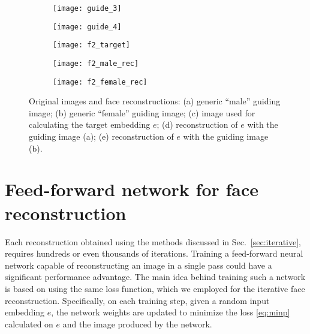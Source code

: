 \documentclass{article}
\def\Emb{e}
\newcommand{\Sec}[1]{Sec.~\ref{#1}}
\begin{document}
  \begin{figure}[b]
  \centering
    \begin{subfigure}{.19\textwidth}
      \centering
      \texttt{[image: guide\_3]}
      \caption{}
      \label{fig:guide1}
    \end{subfigure}
    \begin{subfigure}{.19\textwidth}
      \centering
      \texttt{[image: guide\_4]}
      \caption{}
      \label{fig:guide2}
    \end{subfigure}
    \begin{subfigure}{.19\textwidth}
      \centering
      \texttt{[image: f2\_target]}
      \caption{}
      \label{fig:emb4}
    \end{subfigure}
    \begin{subfigure}{.19\textwidth}
      \centering
      \texttt{[image: f2\_male\_rec]}
      \caption{}
      \label{fig:femmale}
    \end{subfigure}
    \begin{subfigure}{.19\textwidth}
      \centering
      \texttt{[image: f2\_female\_rec]}
      \caption{}
      \label{fig:femfem}
    \end{subfigure}
    \caption{Original images and face reconstructions:
      (a) generic ``male'' guiding image;
      (b) generic ``female'' guiding image;
      (c) image used for calculating the target embedding $\Emb$;
      (d) reconstruction of $e$ with the guiding image (a);
      (e) reconstruction of $e$ with the guiding image (b).}
  \label{fig:set2}
  \end{figure}

\section{Feed-forward network for face reconstruction}
\label{sec:ff}

    Each reconstruction obtained using the methods discussed in \Sec{sec:iterative}, requires hundreds or even thousands of iterations.
    Training a feed-forward neural network capable of reconstructing an image in a single pass could have a significant performance advantage.
    The main idea behind training such a network is based on using the same loss function, which we employed for the iterative face reconstruction.
    Specifically, on each training step, given a random input embedding $\Emb$, the network weights are updated to minimize the loss \eqref{eq:minp} calculated on $\Emb$ and the image produced by the network.
\end{document}
